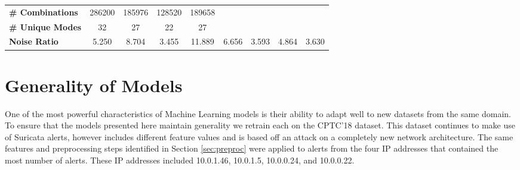 \begin{table}[!htbp]
\begin{adjustbox}{angle=90}
\begin{tabular}{c|c|c|c|c|c|c|c|c}
			\multicolumn{1}{l|}{\textbf{\# Combinations}} & \multicolumn{1}{c|}{286200} & \multicolumn{1}{c|}{185976} & \multicolumn{1}{c|}{128520} & \multicolumn{1}{c|}{189658} & \multicolumn{1}{l|}{} & \multicolumn{1}{l|}{} & \multicolumn{1}{l|}{} & \multicolumn{1}{l}{} \\
			\multicolumn{1}{l|}{\textbf{\# Unique Modes}} & \multicolumn{1}{c|}{32} & \multicolumn{1}{c|}{27} & \multicolumn{1}{c|}{22} & \multicolumn{1}{c|}{27} & \multicolumn{1}{l|}{} & \multicolumn{1}{l|}{} & \multicolumn{1}{l|}{} & \multicolumn{1}{l}{} \\
			\multicolumn{1}{l|}{\textbf{Noise Ratio}} & 5.250 & 8.704 & 3.455 & 11.889 & 6.656 & 3.593 & 4.864 & 3.630
		\end{tabular}
	\end{adjustbox}
\end{table}

\section{Generality of Models}
\label{sec:cptc18}

One of the most powerful characteristics of Machine Learning models is their ability to adapt well to new datasets from the same domain. To ensure that the models presented here maintain generality we retrain each on the CPTC'18 dataset. This dataset continues to make use of Suricata alerts, however includes different feature values and is based off an attack on a completely new network architecture. The same features and preprocessing steps identified in Section \ref{sec:preproc} were applied to alerts from the four IP addresses that contained the most number of alerts. These IP addresses included 10.0.1.46, 10.0.1.5, 10.0.0.24, and 10.0.0.22.

